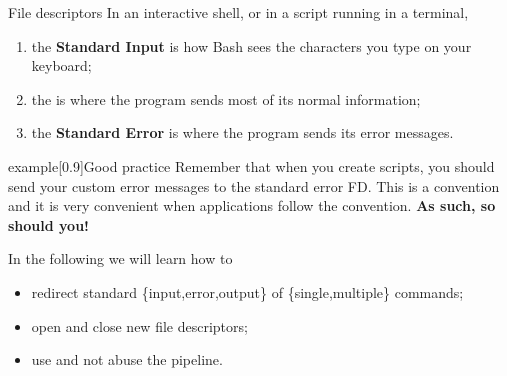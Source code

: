 \begin{frame}
\begin{center}
    \end{center}
\end{frame}
\begin{frame}{File descriptors}
    \vspace{-3mm}
    In an interactive shell, or in a script running in a terminal,
    \begin{enumerate}\addtocounter{enumi}{-1}
        \item the \textbf{Standard Input} is how Bash sees the characters you type on your keyboard;
        \item the  is where the program sends most of its normal information;
        \item the \alert{\textbf{Standard Error}} is where the program sends its error messages.
    \end{enumerate}
    \begin{varblock}{example}[0.9\textwidth]{Good practice}
        Remember that when you create scripts, you should send your custom error messages to the standard error FD.
        This is a convention and it is very convenient when applications follow the convention. \textbf{As such, so should you!}
    \end{varblock}
    \medskip
    In the following we will learn how to
    \begin{itemize}
        \item redirect standard \{input,error,output\} of \{single,multiple\} commands;
        \item open and close new file descriptors;
        \item use and not abuse the pipeline.
    \end{itemize}
\end{frame}
